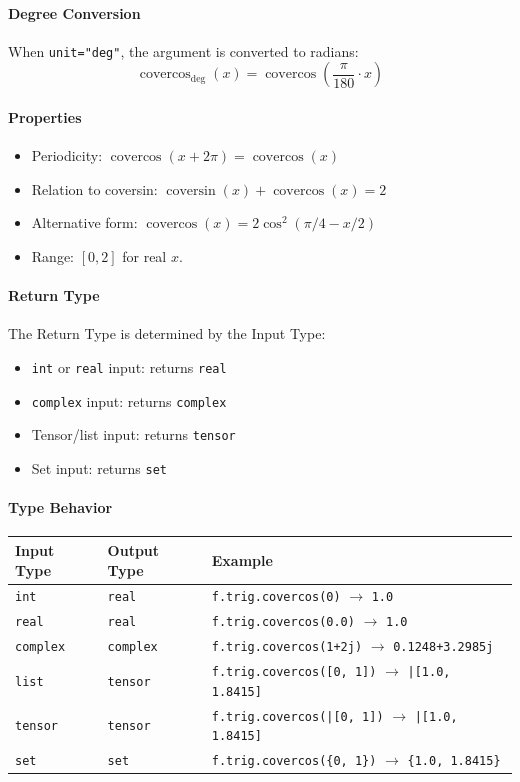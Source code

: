 \paragraph{Degree Conversion}
When \texttt{unit="deg"}, the argument is converted to radians:
\[
\operatorname{covercos}_{\text{deg}}(x) = \operatorname{covercos}\left(\frac{\pi}{180} \cdot x\right)
\]

\paragraph{Properties}
\begin{itemize}
\item Periodicity: $\operatorname{covercos}(x + 2\pi) = \operatorname{covercos}(x)$
\item Relation to coversin: $\operatorname{coversin}(x) + \operatorname{covercos}(x) = 2$
\item Alternative form: $\operatorname{covercos}(x) = 2\cos^2(\pi/4 - x/2)$
\item Range: $[0, 2]$ for real $x$.
\end{itemize}

\paragraph{Return Type}
The Return Type is determined by the Input Type:
\begin{itemize}
\item \texttt{int} or \texttt{real} input: returns \texttt{real}
\item \texttt{complex} input: returns \texttt{complex}
\item Tensor/list input: returns \texttt{tensor}
\item Set input: returns \texttt{set}
\end{itemize}

\paragraph{Type Behavior}
\begin{center}
\begin{tabular}{lll}
\textbf{Input Type} & \textbf{Output Type} & \textbf{Example} \\ \hline
\texttt{int} & \texttt{real} & \texttt{f.trig.covercos(0)} $\to$ \texttt{1.0} \\
\texttt{real} & \texttt{real} & \texttt{f.trig.covercos(0.0)} $\to$ \texttt{1.0} \\
\texttt{complex} & \texttt{complex} & \texttt{f.trig.covercos(1+2j)} $\to$ \texttt{0.1248+3.2985j} \\
\texttt{list} & \texttt{tensor} & \texttt{f.trig.covercos([0, 1])} $\to$ \texttt{|[1.0, 1.8415]} \\
\texttt{tensor} & \texttt{tensor} & \texttt{f.trig.covercos(|[0, 1])} $\to$ \texttt{|[1.0, 1.8415]} \\
\texttt{set} & \texttt{set} & \texttt{f.trig.covercos(\{0, 1\})} $\to$ \texttt{\{1.0, 1.8415\}} \\
\end{tabular}
\end{center}

